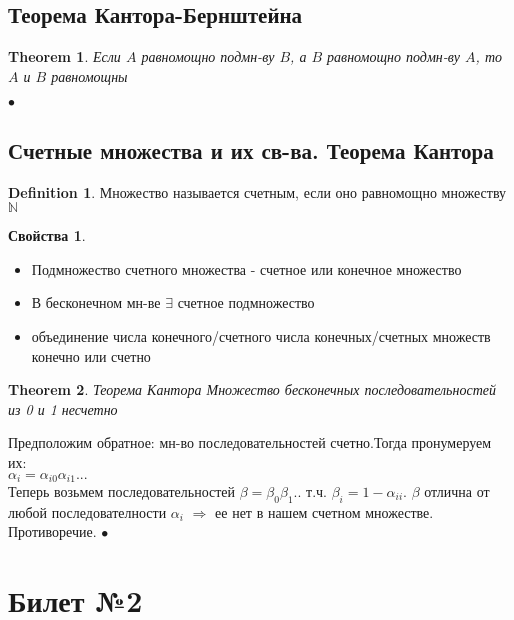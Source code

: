 \documentclass[a4paper]{article}
\theoremstyle{plain}
\newtheorem{theorem}{Theorem}
\theoremstyle{remark}
\theoremstyle{definition}
\newtheorem{definition}{Definition}
\newtheorem{props}{Свойства}
\renewenvironment{proof}{{\bfseries Proof}}{$\bullet$}
\newcommand{\myN}{\mathbb{N}}
\begin{document}
\subsection{Теорема Кантора-Бернштейна}
\begin{theorem}
Если $A$ равномощно подмн-ву $B$, а $B$ равномощно подмн-ву $A$, то $A$ и $B$ равномощны	
\end{theorem}
\begin{proof}
	
\end{proof}
\subsection{Счетные множества и их св-ва. Теорема Кантора}
\begin{definition}
 Множество называется счетным, если оно равномощно множеству $\myN$	
\end{definition}
\begin{props}
\begin{itemize}
\item Подмножество счетного множества - счетное или конечное множество
\item В бесконечном мн-ве $\exists$ счетное подмножество
\item объединение числа конечного/счетного числа конечных/счетных множеств конечно или счетно	
\end{itemize}	
\end{props}
\begin{theorem}{Теорема Кантора}
Множество бесконечных последовательностей из 0 и 1 несчетно	
\end{theorem}
\begin{proof}
Предположим обратное: мн-во последовательностей счетно.Тогда пронумеруем их:\\
$\alpha_i = \alpha_{i0}\alpha_{i1}...$\\
Теперь возьмем последовательностей $\beta=\beta_0\beta_1..$ т.ч. $\beta_i=1-\alpha_{ii}$. $\beta$ отлична от любой последователности $\alpha_i$ $\Rightarrow$ ее нет в нашем счетном множестве. Противоречие.	
\end{proof}
\section{Билет №2}
\end{document}
